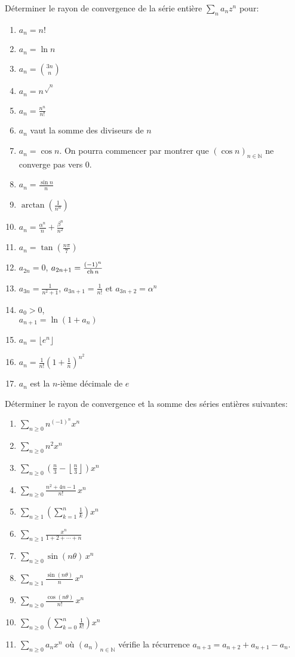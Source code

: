 \documentclass{yann}
\newcommand{\me}{e} %
\begin{document}
Déterminer le rayon de convergence de la série entière $∑_n a_n z^n$ pour:
\begin{multicols}{2}
  \begin{enumerate}
  \item
    $a_n = n!$
  \item
    $a_n = \ln n$
  \item
    $a_n = \binom{3n}{n}$
  \item
    $a_n = n^{√n}$
  \item
    $a_n = \frac{n^n}{n!}$
  \item
    $a_n$ vaut la somme des diviseurs de $n$
  \item
    $a_n = \cos n$.
    On pourra commencer par montrer que $(\cos n)_{n∈ℕ}$ ne converge pas vers $0$.
  \item
    $a_n = \frac{\sin n}{n}$
  \item
    $\arctan\left(\frac1{n^α}\right)$
  \item
    $a_n = \frac{α^n}{n} + \frac{β^n}{n^2}$
  \item
    $a_n = \tan\left(\frac{nπ}{7}\right)$
  \item
    $a_{2n} = 0$,  $a_{2n+1} = \frac{(-1)^n}{\operatorname{ch} n}$
  \item
    $a_{3n} = \frac{1}{n^2+1}$, $a_{3n+1}=\frac{1}{n!}$ et $a_{3n+2} = α^n$
  \item
    $a_0 > 0$, \\ $a_{n+1} = \ln(1+a_n)$
  \item
    $a_n = \lfloor \me^n \rfloor$
  \item
    $a_n = \frac{1}{n!} \left( 1+\frac1n \right)^{n^2}$
  \item
    $a_n$ est la $n$-ième décimale de $e$
  \end{enumerate}
\end{multicols}

\Exercice

Déterminer le rayon de convergence et la somme des séries entières suivantes:
\begin{multicols}{2}
  \begin{enumerate}
  \item
    $∑_{n≥0} n^{(-1)^n} x^n$
  \item
    $∑_{n≥0} n^2 x^n$
  \item
    $∑_{n≥0} \left( \frac n3 - \left\lfloor \frac n3 \right\rfloor \right) x^n$
  \item
    $∑_{n≥0} \frac{n^2+4n-1}{n!} \, x^n$
  \item
    $∑_{n≥1} \left( ∑_{k=1}^n \frac1k \right) x^n$
  \item
    $∑_{n≥1} \frac{x^n}{1+2+\cdots+n}$
  \item
    $∑_{n≥0} \sin(nθ) \, x^n$
  \item
    $∑_{n≥1} \frac{\sin(nθ)}{n} \, x^n$
  \item
    $∑_{n≥0} \frac{\cos(nθ)}{n!} \, x^n$
  \item
    $∑_{n≥0} \left( ∑_{k=0}^n \frac{1}{k!} \right) x^n$
  \item
    $∑_{n≥0} a_n x^n$ où $(a_n)_{n∈ℕ}$ vérifie la récurrence $a_{n+3}=a_{n+2}+a_{n+1}-a_n$.
  \end{enumerate}
\end{multicols}
\end{document}

